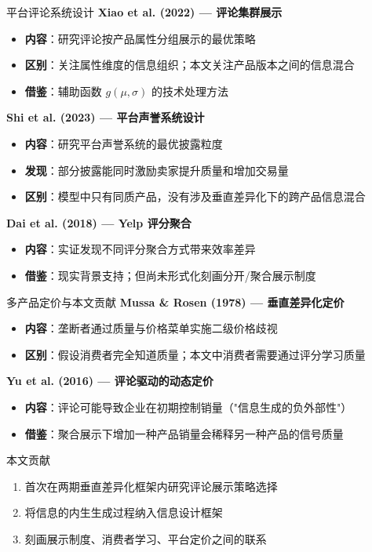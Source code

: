 \documentclass[aspectratio=169,10pt]{beamer}
\newcommand{\pos}[1]{\textcolor{positive}{#1}}
\newcommand{\con}[1]{\textcolor{negative}{#1}}
\newcommand{\HL}[1]{\textcolor{emphasis}{#1}}
\begin{document}
\begin{frame}{平台评论系统设计}
\small
\textbf{Xiao et al. (2022) — 评论集群展示}
\begin{itemize}
    \item \textbf{内容}：研究评论按产品属性分组展示的最优策略
    \item \textbf{区别}：关注\con{属性维度}的信息组织；本文关注\pos{产品版本}之间的信息混合
    \item \textbf{借鉴}：辅助函数 $g(\mu, \sigma)$ 的技术处理方法
\end{itemize}

\vspace{8pt}
\textbf{Shi et al. (2023) — 平台声誉系统设计}
\begin{itemize}
    \item \textbf{内容}：研究平台声誉系统的最优披露粒度
    \item \textbf{发现}：部分披露能同时激励卖家提升质量和增加交易量
    \item \textbf{区别}：模型中只有\con{同质产品}，没有涉及垂直差异化下的跨产品信息混合
\end{itemize}

\vspace{8pt}
\textbf{Dai et al. (2018) — Yelp 评分聚合}
\begin{itemize}
    \item \textbf{内容}：实证发现不同评分聚合方式带来效率差异
    \item \textbf{借鉴}：现实背景支持；但尚未形式化刻画分开/聚合展示制度
\end{itemize}
\end{frame}

\begin{frame}{多产品定价与本文贡献}
\small
\textbf{Mussa \& Rosen (1978) — 垂直差异化定价}
\begin{itemize}
    \item \textbf{内容}：垄断者通过质量与价格菜单实施二级价格歧视
    \item \textbf{区别}：假设消费者完全知道质量；本文中消费者需要\HL{通过评分学习质量}
\end{itemize}

\vspace{8pt}
\textbf{Yu et al. (2016) — 评论驱动的动态定价}
\begin{itemize}
    \item \textbf{内容}：评论可能导致企业在初期控制销量（"信息生成的负外部性"）
    \item \textbf{借鉴}：聚合展示下增加一种产品销量会\con{稀释另一种产品的信号质量}
\end{itemize}

\vspace{10pt}
\begin{block}{本文贡献}
\begin{enumerate}
    \item 首次在\HL{两期垂直差异化}框架内研究评论展示策略选择
    \item 将信息的\pos{内生生成过程}纳入信息设计框架
    \item 刻画展示制度、消费者学习、平台定价之间的联系
\end{enumerate}
\end{block}
\end{frame}
\end{document}
